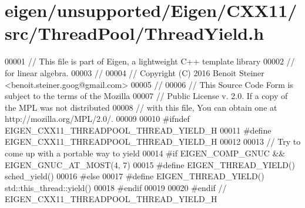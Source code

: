 \hypertarget{eigen_2unsupported_2_eigen_2_c_x_x11_2src_2_thread_pool_2_thread_yield_8h_source}{}\section{eigen/unsupported/\+Eigen/\+C\+X\+X11/src/\+Thread\+Pool/\+Thread\+Yield.h}
\label{eigen_2unsupported_2_eigen_2_c_x_x11_2src_2_thread_pool_2_thread_yield_8h_source}

\begin{DoxyCode}
00001 \textcolor{comment}{// This file is part of Eigen, a lightweight C++ template library}
00002 \textcolor{comment}{// for linear algebra.}
00003 \textcolor{comment}{//}
00004 \textcolor{comment}{// Copyright (C) 2016 Benoit Steiner <benoit.steiner.goog@gmail.com>}
00005 \textcolor{comment}{//}
00006 \textcolor{comment}{// This Source Code Form is subject to the terms of the Mozilla}
00007 \textcolor{comment}{// Public License v. 2.0. If a copy of the MPL was not distributed}
00008 \textcolor{comment}{// with this file, You can obtain one at http://mozilla.org/MPL/2.0/.}
00009 
00010 \textcolor{preprocessor}{#ifndef EIGEN\_CXX11\_THREADPOOL\_THREAD\_YIELD\_H}
00011 \textcolor{preprocessor}{#define EIGEN\_CXX11\_THREADPOOL\_THREAD\_YIELD\_H}
00012 
00013 \textcolor{comment}{// Try to come up with a portable way to yield}
00014 \textcolor{preprocessor}{#if EIGEN\_COMP\_GNUC && EIGEN\_GNUC\_AT\_MOST(4, 7)}
00015 \textcolor{preprocessor}{#define EIGEN\_THREAD\_YIELD() sched\_yield()}
00016 \textcolor{preprocessor}{#else}
00017 \textcolor{preprocessor}{#define EIGEN\_THREAD\_YIELD() std::this\_thread::yield()}
00018 \textcolor{preprocessor}{#endif}
00019 
00020 \textcolor{preprocessor}{#endif  // EIGEN\_CXX11\_THREADPOOL\_THREAD\_YIELD\_H}
\end{DoxyCode}
